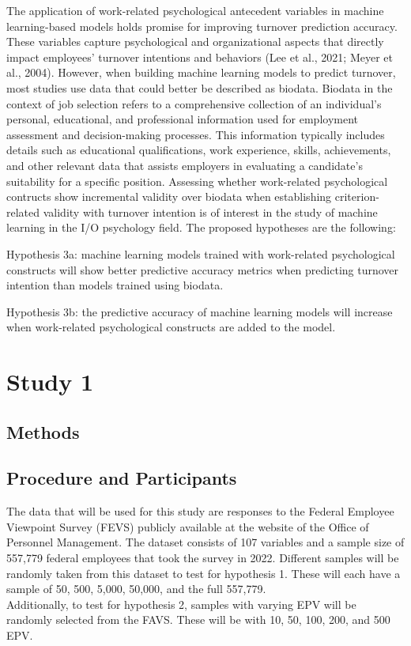 \documentclass[
  man]{apa7}
\begin{document}
The application of work-related psychological antecedent variables in machine learning-based models holds promise for improving turnover prediction accuracy.
These variables capture psychological and organizational aspects that directly impact employees' turnover intentions and behaviors (Lee et al., 2021; Meyer et al., 2004). However, when building machine learning models to predict turnover, most studies use data that could better be described as biodata. Biodata in the context of job selection refers to a comprehensive collection of an individual's personal, educational, and professional information used for employment assessment and decision-making processes. This information typically includes details such as educational qualifications, work experience, skills, achievements, and other relevant data that assists employers in evaluating a candidate's suitability for a specific position.
Assessing whether work-related psychological contructs show incremental validity over biodata when establishing criterion-related validity with turnover intention is of interest in the study of machine learning in the I/O psychology field.
The proposed hypotheses are the following:

Hypothesis 3a: machine learning models trained with work-related psychological constructs will show better predictive accuracy metrics when predicting turnover intention than models trained using biodata.

Hypothesis 3b: the predictive accuracy of machine learning models will increase when work-related psychological constructs are added to the model.

\hypertarget{study-1}{%
\section{Study 1}\label{study-1}}

\hypertarget{methods}{%
\subsection{Methods}\label{methods}}

\hypertarget{procedure-and-participants}{%
\subsection{Procedure and Participants}\label{procedure-and-participants}}

The data that will be used for this study are responses to the Federal Employee Viewpoint Survey (FEVS) publicly available at the website of the Office of Personnel Management.
The dataset consists of 107 variables and a sample size of 557,779 federal employees that took the survey in 2022. Different samples will be randomly taken from this dataset to test for hypothesis 1. These will each have a sample of 50, 500, 5,000, 50,000, and the full 557,779.\\
Additionally, to test for hypothesis 2, samples with varying EPV will be randomly selected from the FAVS. These will be with 10, 50, 100, 200, and 500 EPV.
\end{document}
